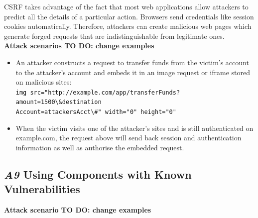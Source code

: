 \documentclass[a5paper,pagesize,10pt,bibtotoc,DIV=10,twoside]{scrbook}
\begin{document}
CSRF takes advantage of the fact that most web applications allow attackers to predict all the details of a particular action. Browsers send credentials like session cookies automatically. Therefore, attackers can create malicious web pages which generate forged requests that are indistinguishable from legitimate ones.\\

\textbf{Attack scenarios \textbf{TO DO:} change examples}

\begin{itemize}
\item An attacker constructs a request to transfer funds from the victim's account to the attacker's account and embeds it in an image request or iframe stored on malicious sites:\\
\small{\big\langle\verb|img src="http://example.com/app/transferFunds?|}\\
\small{\verb|amount=1500\&destination|}\\
\small{\verb|Account=attackersAcct\#" width="0" height="0"|\big\rangle}
\item When the victim visits one of the attacker's sites and is still authenticated on example.com, the request above will send back session and authentication information as well as authorise the embedded request.
\end{itemize}


\subsection{\textit{A9}  \normalsize{Using Components with Known Vulnerabilities}}


\vspace{2mm}
\textbf{Attack scenario \textbf{TO DO:} change examples}
\end{document}
